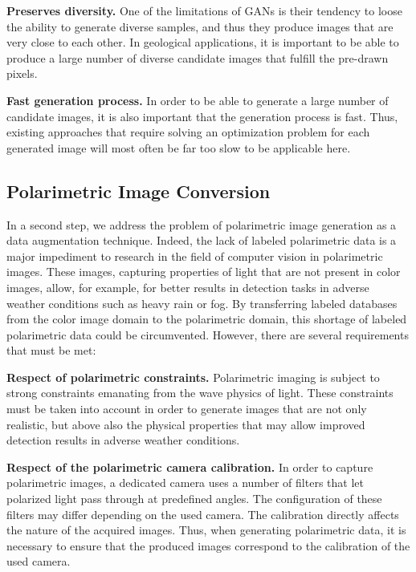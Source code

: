 \textbf{Preserves diversity.} One of the limitations of \ac{GANs} is their tendency to loose the ability to generate diverse samples, and thus they produce images that are very close to each other. In geological applications, it is important to be able to produce a large number of diverse candidate images that fulfill the pre-drawn pixels.

\textbf{Fast generation process.} In order to be able to generate a large number of candidate images, it is also important that the generation process is fast. Thus, existing approaches that require solving an optimization problem for each generated image will most often be far too slow to be applicable here.

\subsection*{Polarimetric Image Conversion}

\quad In a second step, we address the problem of polarimetric image generation as a data augmentation technique. Indeed, the lack of labeled polarimetric data is a major impediment to research in the field of computer vision in polarimetric images. These images, capturing properties of light that are not present in color images, allow, for example, for better results in detection tasks in adverse weather conditions such as heavy rain or fog. By transferring labeled databases from the color image domain to the polarimetric domain, this shortage of labeled polarimetric data could be circumvented. However, there are several requirements that must be met:

\textbf{Respect of polarimetric constraints.} Polarimetric imaging is subject to strong constraints emanating from the wave physics of light. These constraints must be taken into account in order to generate images that are not only realistic, but above also the physical properties that may allow improved detection results in adverse weather conditions.

\textbf{Respect of the polarimetric camera calibration.} In order to capture polarimetric images, a dedicated camera uses a number of filters that let polarized light pass through at predefined angles. The configuration of these filters may differ depending on the used camera. The calibration directly affects the nature of the acquired images. Thus, when generating polarimetric data, it is necessary to ensure that the produced images correspond to the calibration of the used camera.

